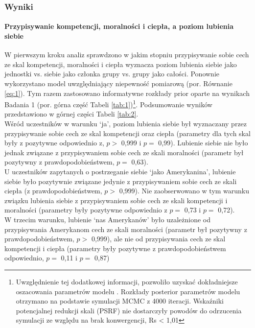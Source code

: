 \documentclass[man]{apa6}
\begin{document}
\subsubsection{Wyniki}

\paragraph{Przypisywanie kompetencji, moralności i ciepła, a poziom lubienia siebie}

W pierwszym kroku analiz sprawdzono w jakim stopniu przypisywanie sobie cech ze skal kompetencji, moralności i ciepła wyznacza poziom lubienia siebie jako jednostki vs. siebie jako członka grupy vs. grupy jako całości. Ponownie wykorzystano model uwzględniający niepewność pomiarową (por. Równanie \ref{eq:1}). Tym razem zastosowano informatywne rozkłady prior oparte na wynikach Badania 1 (por. górna część Tabeli \ref{tab:1})\footnote{Uwzględnienie tej dodatkowej informacji, pozwoliło uzyskać dokładniejsze oszacowania parametrów modelu \parencite[zob. np.][]{gill2014bayesian}. Rozkłady posterior parametrów modelu otrzymano na podstawie symulacji MCMC z 4000 iteracji. Wskaźniki potencjalnej redukcji skali (PSRF) nie dostarczyły powodów do odrzucenia symulacji ze względu na brak konwergencji, Rs < 1,01}. Podsumowanie wyników przedstawiono w górnej części Tabeli \ref{tab:2}. \\

Wśród uczestników w warunku `ja', poziom lubienia siebie był wyznaczany przez przypisywanie sobie cech ze skal kompetencji oraz ciepła (parametry dla tych skal były z pozytywne odpowiednio z, $p > $ 0,999 i $p = $ 0,99). Lubienie siebie nie było jednak związane z przypisywaniem sobie cech ze skali moralności (parametr był pozytywny z prawdopodobieństwem, $p = $ 0,63). \\

U uczestników zapytanych o postrzeganie siebie `jako Amerykanina', lubienie siebie było pozytywnie związane jedynie z przypisywaniem sobie cech ze skali ciepła (z prawdopodobieństwem, $p >$ 0,999). Nie zaobserwowano w tym warunku związku lubienia siebie z przypisywaniem sobie cech ze skali kompetencji i moralności (parametry były pozytywne odpowiednio z $p =$  0,73 i $p =$ 0,72).\\

W trzecim warunku, lubienie `nas Amerykanów' było uzależnione od przypisywania Amerykanom cech ze skali moralności (parametr był pozytywny z prawdopodobieństwem, $p >$ 0,999), ale nie od przypisywania cech ze skal kompetencji i ciepła (parametry były pozytywne z prawdopodobieństwem odpowiednio, $p =$ 0,11 i $p =$ 0,87)
\end{document}

